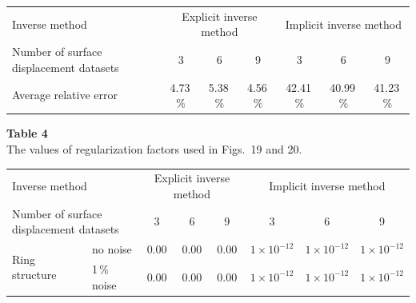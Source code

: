 \documentclass[11pt]{article}
\begin{document}
\begin{center}
\small
\begin{tabular}{@{}l ccc ccc@{}}
\toprule
Inverse method
  & \multicolumn{3}{c}{Explicit inverse method}
  & \multicolumn{3}{c}{Implicit inverse method} \\
\cmidrule(lr){2-4}\cmidrule(lr){5-7}
Number of surface displacement datasets
  & 3 & 6 & 9 & 3 & 6 & 9 \\
\midrule
Average relative error
  & 4.73\,\% & 5.38\,\% & 4.56\,\%
  & 42.41\,\% & 40.99\,\% & 41.23\,\% \\
\bottomrule
\end{tabular}
\end{center}

\vspace{1em}

\noindent\textbf{Table 4}\\[0.2em]
{\small The values of regularization factors used in Figs.~19 and 20.}
\vspace{0.3em}

\begin{center}
\small
\begin{tabular}{@{}ll ccc ccc@{}}
\toprule
\multicolumn{2}{l}{Inverse method}
  & \multicolumn{3}{c}{Explicit inverse method}
  & \multicolumn{3}{c}{Implicit inverse method} \\
\cmidrule(lr){3-5}\cmidrule(lr){6-8}
\multicolumn{2}{l}{Number of surface displacement datasets}
  & 3 & 6 & 9 & 3 & 6 & 9 \\
\midrule
\multirow{2}{*}{Ring structure}
  & no noise    & 0.00 & 0.00 & 0.00 & $1\times 10^{-12}$ & $1\times 10^{-12}$ & $1\times 10^{-12}$ \\
  & 1\,\% noise & 0.00 & 0.00 & 0.00 & $1\times 10^{-12}$ & $1\times 10^{-12}$ & $1\times 10^{-12}$ \\
\bottomrule
\end{tabular}
\end{center}

\vspace{1em}
\end{document}
